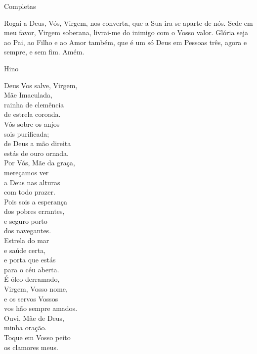 \documentclass{book}
\begin{document}
\newpage
\begin{center}
    Completas
\end{center}
\begin{flushleft}
    Rogai a Deus, Vós, Virgem, nos converta, que a Sua ira se aparte de nós. Sede em meu favor, Virgem soberana, livrai-me do inimigo com o Vosso valor. Glória seja ao Pai, ao Filho e ao Amor também, que é um só Deus em Pessoas três, agora e sempre, e sem fim. Amém.
\end{flushleft}
\begin{center}
    \textcolor{VioletRed2}{Hino}
\end{center}
\begin{multicols}{2}
    Deus Vos salve, Virgem, \\
    Mãe Imaculada, \\
    rainha de clemência \\
    de estrela coroada.
    \vspace{.2cm} \\
    Vós sobre os anjos \\
    sois purificada; \\
    de Deus a mão direita \\
    estás de ouro ornada.
    \vspace{.2cm} \\
    Por Vós, Mãe da graça, \\
    mereçamos ver \\
    a Deus nas alturas \\
    com todo prazer.
    \vspace{.2cm} \\
    Pois sois a esperança \\
    dos pobres errantes, \\
    e seguro porto \\
    dos navegantes.
    \vspace{.2cm} \\
    Estrela do mar \\
    e saúde certa, \\
    e porta que estás \\
    para o céu aberta.
    \vspace{.2cm} \\
    É óleo derramado, \\
    Virgem, Vosso nome, \\
    e os servos Vossos \\
    vos hão sempre amados.
    \vspace{.2cm} \\
    Ouvi, Mãe de Deus, \\
    minha oração. \\
    Toque em Vosso peito \\
    os clamores meus.
\end{multicols}
\end{document}
